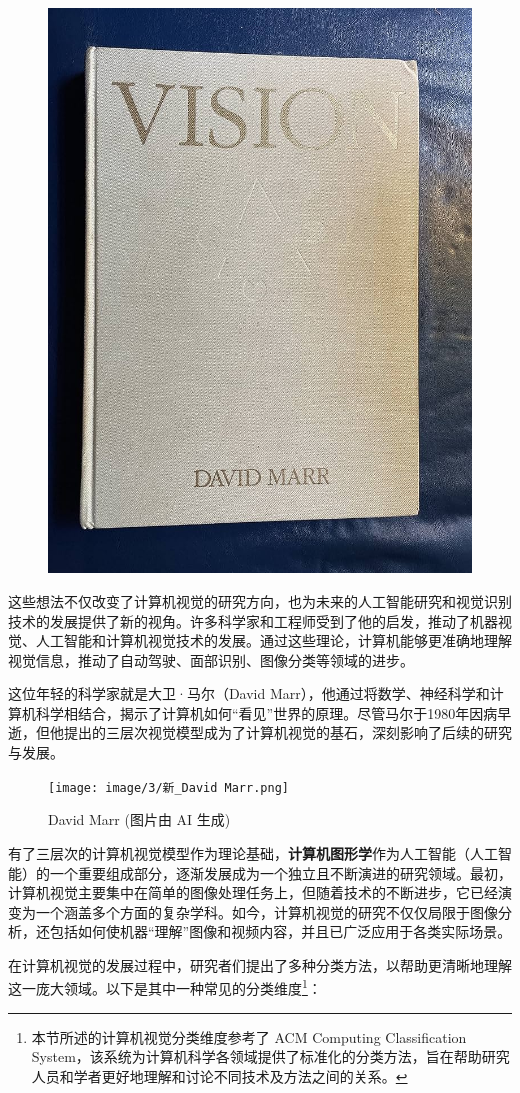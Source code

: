 \begin{figure}[htb]
	\centering
	\includegraphics[width=0.5\linewidth]{image/3/vision.jpg}
\end{figure}


这些想法不仅改变了计算机视觉的研究方向，也为未来的人工智能研究和视觉识别技术的发展提供了新的视角。许多科学家和工程师受到了他的启发，推动了机器视觉、人工智能和计算机视觉技术的发展。通过这些理论，计算机能够更准确地理解视觉信息，推动了自动驾驶、面部识别、图像分类等领域的进步。

这位年轻的科学家就是大卫·马尔（David Marr），他通过将数学、神经科学和计算机科学相结合，揭示了计算机如何“看见”世界的原理。尽管马尔于1980年因病早逝，但他提出的三层次视觉模型成为了计算机视觉的基石，深刻影响了后续的研究与发展。



\begin{figure}[htb]
	\centering
	\texttt{[image: image/3/新\_David Marr.png]}
	\caption{David Marr (图片由 AI 生成)}
\end{figure}

有了三层次的计算机视觉模型作为理论基础，\textbf{计算机图形学}作为人工智能（人工智能）的一个重要组成部分，逐渐发展成为一个独立且不断演进的研究领域。最初，计算机视觉主要集中在简单的图像处理任务上，但随着技术的不断进步，它已经演变为一个涵盖多个方面的复杂学科。如今，计算机视觉的研究不仅仅局限于图像分析，还包括如何使机器“理解”图像和视频内容，并且已广泛应用于各类实际场景。

在计算机视觉的发展过程中，研究者们提出了多种分类方法，以帮助更清晰地理解这一庞大领域。以下是其中一种常见的分类维度\footnote{本节所述的计算机视觉分类维度参考了 ACM Computing Classification System，该系统为计算机科学各领域提供了标准化的分类方法，旨在帮助研究人员和学者更好地理解和讨论不同技术及方法之间的关系。}：

